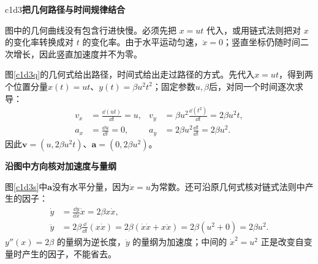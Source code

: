 \begin{drillsolution}{c1d3}\textbf{把几何路径与时间规律结合}\par\nobreak
图中的几何曲线没有包含行进快慢。必须先把 $x=ut$ 代入，或用链式法则把对 $x$ 的变化率转换成对 $t$ 的变化率。由于水平运动匀速，$\ddot x=0$；竖直坐标仍随时间二次增长，因此竖直加速度并不为零。

图\ref{c1d3q}的几何式给出路径，时间式给出走过路径的方式。先代入$x=ut$，得到两个位置分量$x(t)=ut$、$y(t)=\beta u^2t^2$；固定参数$u,\beta$后，对同一个时间逐次求导：
\begin{align*}
v_x&=\frac{\dd(ut)}{\dd t}=u,
&v_y&=\beta u^2\frac{\dd(t^2)}{\dd t}=2\beta u^2t,\\
a_x&=\frac{\dd u}{\dd t}=0,
&a_y&=2\beta u^2\frac{\dd t}{\dd t}=2\beta u^2.
\end{align*}
因此$\bm v=(u,2\beta u^2t)$、$\bm a=(0,2\beta u^2)$。


\par\medskip{}\noindent\textbf{沿图中方向核对加速度与量纲}\par\nobreak
图\ref{c1d3s}中$\bm a$没有水平分量，因为$\dot x=u$为常数。还可沿原几何式核对链式法则中产生的因子：
\begin{align*}
\dot y&=\frac{\dd y}{\dd x}\dot x=2\beta x\dot x,\\
\ddot y&=2\beta\frac{\dd}{\dd t}(x\dot x)
=2\beta(\dot x\dot x+x\ddot x)
=2\beta(u^2+0)=2\beta u^2.
\end{align*}
$y''(x)=2\beta$ 的量纲为逆长度，$\ddot y$ 的量纲为加速度；中间的 $\dot x^2=u^2$ 正是改变自变量时产生的因子，不能省去。
\end{drillsolution}

